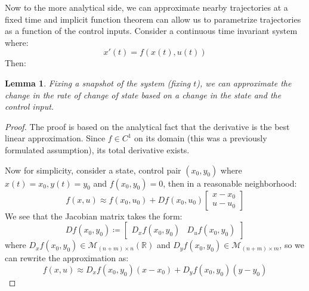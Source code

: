 \documentclass[10pt,letterpaper]{article} %
\newtheorem{lem}{Lemma}[section]
\begin{document}
Now to the more analytical side, we can approximate nearby trajectories at a fixed time and implicit function theorem can allow us to parametrize trajectories as a function of the control inputs. Consider a continuous time invariant system where:
\begin{equation*}
x'(t) = f(x(t), u(t))
\end{equation*}
Then:
\begin{lem}
Fixing a snapshot of the system (fixing $t$), we can approximate the change in the rate of change of state based on a change in the state and the control input.
\end{lem}
\begin{proof}
The proof is based on the analytical fact that the derivative is the best linear approximation. Since $f \in C^1$ on its domain (this was a previously formulated assumption), its total derivative exists.

Now for simplicity, consider a state, control pair $(x_0, y_0)$ where $x(t) = x_0, y(t) = y_0$ and $f(x_0, y_0) = 0$, then in a reasonable neighborhood:
\begin{equation*}
f(x, u) \approx f(x_0, u_0) + Df(x_0, u_0)\begin{bmatrix}
x-x_0\\
u-u_0
\end{bmatrix}
\end{equation*}
We see that the Jacobian matrix takes the form:
\begin{equation*}
Df(x_0, y_0) \coloneq \begin{bmatrix}
D_xf(x_0, y_0) & D_uf(x_0, y_0)
\end{bmatrix}
\end{equation*}
where $D_xf(x_0, y_0) \in \mathcal{M}_{(n+m) \times n}(\mathbb{R})$ and $D_yf(x_0, y_0) \in \mathcal{M}_{(n+m) \times m}$, so we can rewrite the approximation as:
\begin{equation*}
f(x, u) \approx D_xf(x_0, y_0)(x - x_0) + D_yf(x_0, y_0)(y - y_0)
\end{equation*}
\end{proof}
\end{document}
